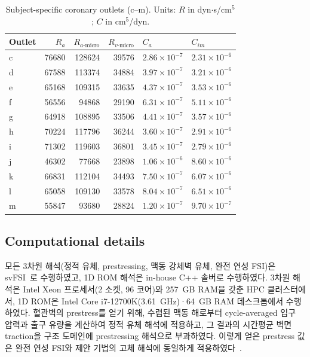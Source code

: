 \documentclass[master,english,final]{kaist-ucs}
\begin{document}
\begin{table}[ht]
\caption[Subject-specific coronary boundary conditions]{Subject-specific coronary outlets (c--m). Units: $R$ in dyn$\cdot$s/cm$^5$; $C$ in cm$^5$/dyn.}
\label{tab:bc-subject-coronary}
\begin{center}
\small
\begin{tabular}{lrrrll}
\hline\hline
Outlet & $R_a$ & $R_{a\text{-micro}}$ & $R_{v\text{-micro}}$ & $C_a$ & $C_{im}$ \\
\hline
c & 76680 & 128624 & 39576 & $2.86\times10^{-7}$ & $2.31\times10^{-6}$ \\
d & 67588 & 113374 & 34884 & $3.97\times10^{-7}$ & $3.21\times10^{-6}$ \\
e & 65168 & 109315 & 33635 & $4.37\times10^{-7}$ & $3.53\times10^{-6}$ \\
f & 56556 & 94868  & 29190 & $6.31\times10^{-7}$ & $5.11\times10^{-6}$ \\
g & 64918 & 108895 & 33506 & $4.41\times10^{-7}$ & $3.57\times10^{-6}$ \\
h & 70224 & 117796 & 36244 & $3.60\times10^{-7}$ & $2.91\times10^{-6}$ \\
i & 71302 & 119603 & 36801 & $3.45\times10^{-7}$ & $2.79\times10^{-6}$ \\
j & 46302 & 77668  & 23898 & $1.06\times10^{-6}$ & $8.60\times10^{-6}$ \\
k & 66831 & 112104 & 34493 & $7.50\times10^{-7}$ & $6.07\times10^{-6}$ \\
l & 65058 & 109130 & 33578 & $8.04\times10^{-7}$ & $6.51\times10^{-6}$ \\
m & 55847 & 93680  & 28824 & $1.20\times10^{-7}$ & $9.70\times10^{-7}$ \\
\hline\hline
\end{tabular}
\end{center}
\end{table}

\subsection{Computational details}
모든 3차원 해석(정적 유체, prestressing, 맥동 강체벽 유체, 완전 연성 FSI)은 svFSI~\cite{zhu2022svfsi}로 수행하였고, 1D ROM 해석은 in-house C++ 솔버로 수행하였다. 3차원 해석은 Intel Xeon 프로세서(2 소켓, 96 코어)와 257~GB RAM을 갖춘 HPC 클러스터에서, 1D ROM은 Intel Core i7-12700K(3.61~GHz)·64~GB RAM 데스크톱에서 수행하였다. 혈관벽의 prestress를 얻기 위해, 수렴된 맥동 해로부터 cycle-averaged 입구 압력과 출구 유량을 계산하여 정적 유체 해석에 적용하고, 그 결과의 시간평균 벽면 traction을 구조 도메인에 prestressing 해석으로 부과하였다. 이렇게 얻은 prestress 값은 완전 연성 FSI와 제안 기법의 고체 해석에 동일하게 적용하였다~\cite{prestress}. 
\end{document}
